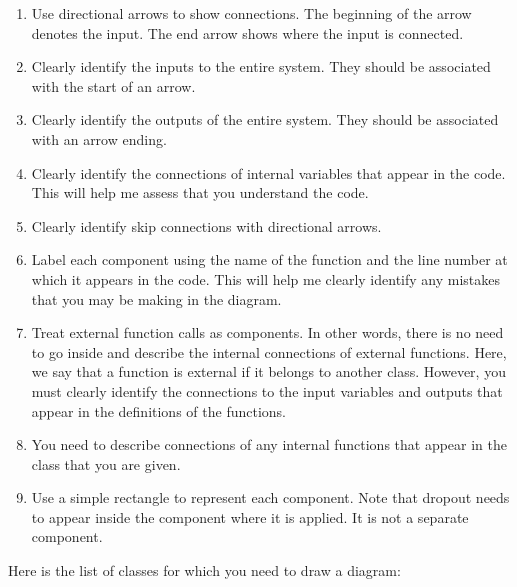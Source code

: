 \documentclass[12pt]{article}
\begin{document}
	\begin{enumerate}[itemsep=8pt]
		
		\item[(i)] Use directional arrows to show connections. The beginning of the arrow denotes the input. The end arrow shows where the input is connected.
		
		\item[(ii)] Clearly identify the inputs to the entire system. They should be associated with the start of an arrow.
		
		\item[(iii)] Clearly identify the outputs of the entire system. They should be associated with an arrow ending.
		
		\item[(iv)] Clearly identify the connections of internal variables that appear in the code. This will help me assess that you understand the code.
		
		\item[(v)] Clearly identify skip connections with directional arrows.
		
		\item[(vi)] Label each component using the name of the function and the line number at which it appears in the code. This will help me clearly identify any mistakes that you may be making in the diagram.
		
		\item[(vii)] Treat external function calls as components. In other words, there is no need to go inside and describe the internal connections of external functions. Here, we say that a function is external if it belongs to another class. However, you must clearly identify the connections to the input variables and outputs that appear in the definitions of the functions.
		
		\item[(viii)] You need to describe connections of any internal functions that appear in the class that you are given.
		
		\item[(ix)] Use a simple rectangle to represent each component. Note that dropout needs to appear inside the component where it is applied. It is not a separate component.
		
	\end{enumerate}
	
	Here is the list of classes for which you need to draw a diagram:
	
\end{document}
